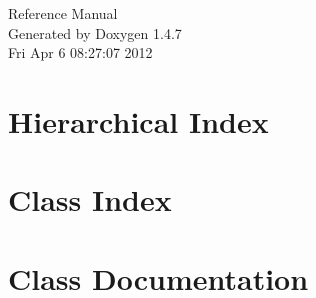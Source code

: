\documentclass[a4paper]{book}
\begin{document}
\begin{titlepage}
\vspace*{7cm}
\begin{center}
{\Large Reference Manual}\\
\vspace*{1cm}
{\large Generated by Doxygen 1.4.7}\\
\vspace*{0.5cm}
{\small Fri Apr 6 08:27:07 2012}\\
\end{center}
\end{titlepage}
\clearemptydoublepage
{}
\tableofcontents
\clearemptydoublepage
{}
\chapter{Hierarchical Index}

\chapter{Class Index}

\chapter{Class Documentation}





























\printindex
\end{document}
